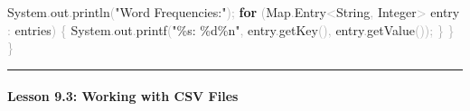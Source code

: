 \documentclass[
  justified,
  openright,
]{tufte-book}
\let\subsection\paragraph
\let\paragraph\paragraph
\newcommand{\KeywordTok}[1]{\textcolor{CodeKeyword}{\textbf{#1}}}  %
\newcommand{\StringTok}[1]{\textcolor{CodeString}{#1}}              %
\newcommand{\CodeFuncTok}[1]{\textcolor{CodeKeyword}{#1}}           %
\newcommand{\OperatorTok}[1]{\textcolor{DarkGray}{#1}}              %
\newenvironment{Shaded}{%
  \begin{mdframed}[style=TufteCode]%
}{%
  \end{mdframed}%
}
\let\subsection\paragraph
\let\paragraph\paragraph
\begin{document}
\begin{Shaded}
\begin{Highlighting}[]
        System\OperatorTok{.}\CodeFuncTok{out}\OperatorTok{.}\CodeFuncTok{println}\OperatorTok{(}\StringTok{"Word Frequencies:"}\OperatorTok{);}
        \KeywordTok{for} \OperatorTok{(}Map\OperatorTok{.}\CodeFuncTok{Entry}\OperatorTok{\textless{}}String\OperatorTok{,} Integer\OperatorTok{\textgreater{}} entry \OperatorTok{:} entries\OperatorTok{)} \OperatorTok{\{}
            System\OperatorTok{.}\CodeFuncTok{out}\OperatorTok{.}\CodeFuncTok{printf}\OperatorTok{(}\StringTok{"\textquotesingle{}}\StringTok{\%s}\StringTok{\textquotesingle{}: }\StringTok{\%d\%n}\StringTok{"}\OperatorTok{,} entry\OperatorTok{.}\CodeFuncTok{getKey}\OperatorTok{(),} entry\OperatorTok{.}\CodeFuncTok{getValue}\OperatorTok{());}
        \OperatorTok{\}}
    \OperatorTok{\}}
\OperatorTok{\}}
\end{Highlighting}
\end{Shaded}

\begin{center}\rule{0.5\linewidth}{0.5pt}\end{center}

\subsection{Lesson 9.3: Working with CSV
Files}\label{lesson-9.3-working-with-csv-files}
\end{document}
